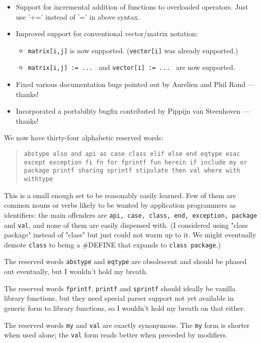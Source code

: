 \begin{itemize}
\begin{itemize}
\begin{itemize}
\begin{verbatim}
\end{verbatim}
\end{itemize}
\end{itemize}
\item Support for incremental addition of functions to overloaded operators. Just use '+=' instead of '=' in above syntax.
\item Improved support for conventional vector/matrix notation:
\begin{itemize}
\item {\tt matrix[i,j]} is now supported. ({\tt vector[i]} was already supported.)
\item {\tt matrix[i,j] := ... } and {\tt vector[i] := ... } are now supported.
\end{itemize}
\item Fixed various documentation bugs pointed out by Aurelien and Phil Rand --- thanks!
\item Incorporated a portability bugfix contributed by Pippijn van Steenhoven --- thanks!
\end{itemize}

We now have thirty-four alphabetic reserved words:
\begin{quotation}
{\tt abstype also and api as case class elif else end eqtype esac except 
exception fi fn for fprintf fun herein if include my or package printf 
sharing sprintf stipulate then val where with withtype}
\end{quotation}
This is a small enough set to be reasonably easily learned.  Few of 
them are common nouns or verbs likely to be wanted by application programmers 
as identifiers: the main offenders are {\tt api, case, class, end, exception, package} and {\tt val}, 
and none of them are easily dispensed with.  (I considered using "class package" 
instead of "class" but just could not warm up to it. We might eventually demote 
{\tt class} to being a \#DEFINE that expands to {\tt class package}.)

The reserved words {\tt abstype} and {\tt eqtype} are obsolescent and should be phased out 
eventually, but I wouldn't hold my breath.

The reserved words {\tt fprintf}, 
{\tt printf} and {\tt sprintf} should ideally be vanilla library functions, 
but they need special parser support not yet available in generic form to 
library functions, so I wouldn't hold my breath on that either.

The reserved words {\tt my} and {\tt val} are exactly synonymous.  The 
{\tt my} form is shorter when used alone; the {\tt val} form reads better 
when preceded by modifiers.


